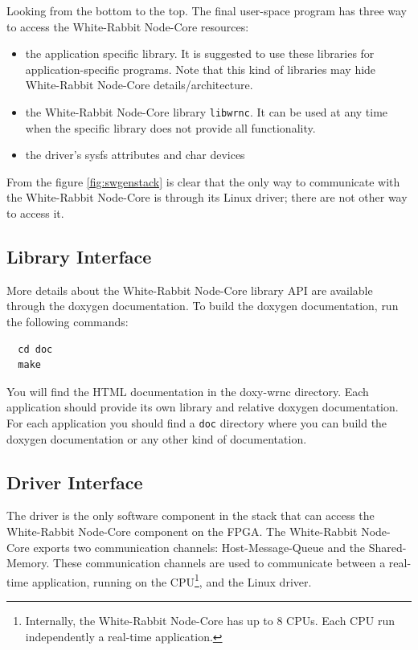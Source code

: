 \documentclass[a4paper,10pt]{article}
\begin{document}
Looking from the bottom to the top. The final user-space program has
three way to access the White-Rabbit Node-Core resources:

\begin{itemize}
  \item the application specific library. It is suggested to use these
    libraries for application-specific programs. Note that this kind of
    libraries may hide White-Rabbit Node-Core details/architecture.
  \item the White-Rabbit Node-Core library \texttt{libwrnc}. It can be
    used at any time when the specific library does not provide all
    functionality.
  \item the driver's sysfs attributes and char devices
\end{itemize}

From the figure \ref{fig:swgenstack} is clear that the only way to
communicate with the White-Rabbit Node-Core is through its Linux
driver; there are not other way to access it.


\subsection{Library Interface}%
More details about the White-Rabbit Node-Core library API are
available through the doxygen documentation. To build the doxygen
documentation, run the following commands:

\begin{verbatim}
  cd doc
  make
\end{verbatim}

You will find the HTML documentation in the doxy-wrnc directory. Each
application should provide its own library and relative doxygen
documentation. For each application you should find a \texttt{doc}
directory where you can build the doxygen documentation or any other
kind of documentation.


\subsection{Driver Interface}%
The driver is the only software component in the stack that can access
the White-Rabbit Node-Core component on the FPGA. The White-Rabbit
Node-Core exports two communication channels: Host-Message-Queue and
the Shared-Memory. These communication channels are used to communicate
between a real-time application, running on the
CPU\footnote{Internally, the White-Rabbit Node-Core has up to 8 CPUs.
Each CPU run independently a real-time application.}, and the Linux
driver.
\end{document}
